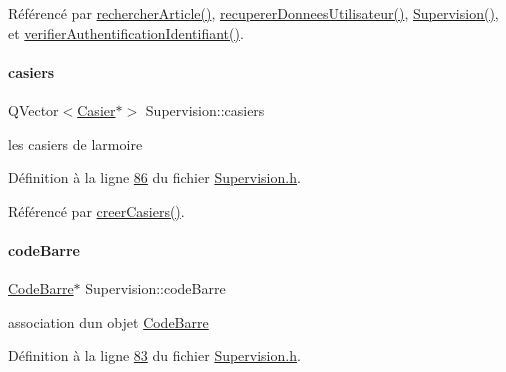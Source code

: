 Référencé par \hyperlink{_supervision_8cpp_source_l00305}{rechercher\+Article()}, \hyperlink{_supervision_8cpp_source_l00165}{recuperer\+Donnees\+Utilisateur()}, \hyperlink{_supervision_8cpp_source_l00036}{Supervision()}, et \hyperlink{_supervision_8cpp_source_l00141}{verifier\+Authentification\+Identifiant()}.

\mbox{\label{class_supervision_a3ac996538c83f3bd3df36095b0abb1b2}} 
\paragraph{\texorpdfstring{casiers}{casiers}}
{\footnotesize\ttfamily Q\+Vector$<$\hyperlink{class_casier}{Casier}$\ast$$>$ Supervision\+::casiers\hspace{0.3cm}{\ttfamily [private]}}



les casiers de l\textquotesingle{}armoire 



Définition à la ligne \hyperlink{_supervision_8h_source_l00086}{86} du fichier \hyperlink{_supervision_8h_source}{Supervision.\+h}.



Référencé par \hyperlink{_supervision_8cpp_source_l00090}{creer\+Casiers()}.

\mbox{\label{class_supervision_ac01c57f7fd9d043ab46d439e55e426e5}} 
\paragraph{\texorpdfstring{code\+Barre}{codeBarre}}
{\footnotesize\ttfamily \hyperlink{class_code_barre}{Code\+Barre}$\ast$ Supervision\+::code\+Barre\hspace{0.3cm}{\ttfamily [private]}}



association d\textquotesingle{}un objet \hyperlink{class_code_barre}{Code\+Barre} 



Définition à la ligne \hyperlink{_supervision_8h_source_l00083}{83} du fichier \hyperlink{_supervision_8h_source}{Supervision.\+h}.



